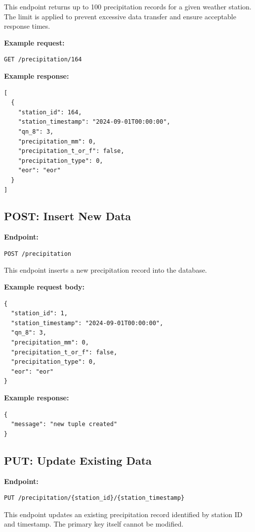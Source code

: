 This endpoint returns up to 100 precipitation records for a given weather station.
The limit is applied to prevent excessive data transfer and ensure acceptable response times.
\par\vspace{0.5em}
\textbf{Example request:}
\begin{verbatim}
GET /precipitation/164
\end{verbatim}

\textbf{Example response:}
\begin{verbatim}
[
  {
    "station_id": 164,
    "station_timestamp": "2024-09-01T00:00:00",
    "qn_8": 3,
    "precipitation_mm": 0,
    "precipitation_t_or_f": false,
    "precipitation_type": 0,
    "eor": "eor"
  }
]
\end{verbatim}

\subsection{POST: Insert New Data}

\textbf{Endpoint:}
\begin{verbatim}
POST /precipitation
\end{verbatim}

This endpoint inserts a new precipitation record into the database.
\par\vspace{0.5em}

\textbf{Example request body:}
\begin{verbatim}
{
  "station_id": 1,
  "station_timestamp": "2024-09-01T00:00:00",
  "qn_8": 3,
  "precipitation_mm": 0,
  "precipitation_t_or_f": false,
  "precipitation_type": 0,
  "eor": "eor"
}
\end{verbatim}

\textbf{Example response:}
\begin{verbatim}
{
  "message": "new tuple created"
}
\end{verbatim}

\subsection{PUT: Update Existing Data}

\textbf{Endpoint:}
\begin{verbatim}
PUT /precipitation/{station_id}/{station_timestamp}
\end{verbatim}

This endpoint updates an existing precipitation record identified by station ID and timestamp.
The primary key itself cannot be modified.
\par\vspace{0.5em}

